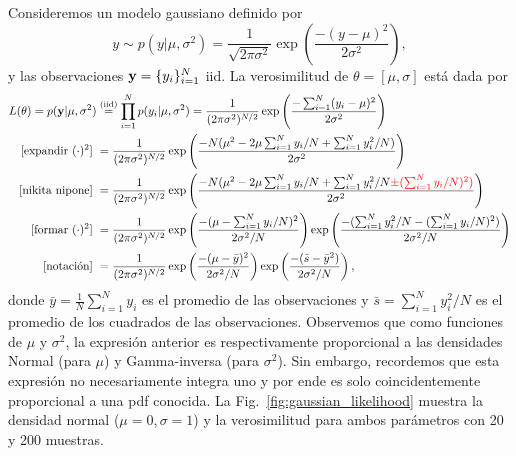 \begin{mdframed}[style=ejemplo, frametitle={\center Ejemplo: Verosimilitud para el modelo gaussiano  (muestras  independientes)}]

Consideremos un  modelo gaussiano definido por 
\begin{equation}
	y \sim p(y|\mu,\sigma^2) = \frac{1}{\sqrt{2\pi\sigma^2}}\exp\left(\frac{-(y-\mu)^2}{2\sigma^2}\right), \label{eq:ejemplo_gaussiano}
\end{equation}
y las observaciones $\mathbf{y} = \{y_i\}_{i=1}^N$ iid. La verosimilitud  de $\theta  =  [\mu,\sigma]$ está dada por 
\begin{align}
  	L(\theta)  =  p(\mathbf{y}|\mu,\sigma^2) 
  				&\stackrel{\text{(iid)}}{=}\prod_{i=1}^N p(y_i|\mu,\sigma^2) 
  				 = \frac{1}{(2\pi\sigma^2)^{N/2}}  \exp\left(\frac{-\sum_{i=1}^N(y_i-\mu)^2}{2\sigma^2}\right)\\
  				\text{[expandir $(\cdot)^2$]}\  & = \frac{1}{(2\pi\sigma^2)^{N/2}}  \exp\left(\frac{-N(\mu^2 - 2\mu\sum_{i=1}^Ny_i/N + \sum_{i=1}^Ny_i^2/N)}{2\sigma^2}\right)\nonumber\\
  				\text{[nikita nipone]}\  & = \frac{1}{(2\pi\sigma^2)^{N/2}}  \exp\left(\frac{-N(\mu^2 - 2\mu\sum_{i=1}^Ny_i/N + \sum_{i=1}^Ny_i^2/N \textcolor{red}{ \pm (\sum_{i=1}^Ny_i/N)^2)}}{2\sigma^2}\right)\nonumber\\
  				\text{[formar $(\cdot)^2$]}\  & = \frac{1}{(2\pi\sigma^2)^{N/2}}  \exp\left(\frac{-(\mu - \sum_{i=1}^Ny_i/N)^2}{2\sigma^2/N}\right)
  				\exp\left(\frac{-(\sum_{i=1}^Ny_i^2/N  - (\sum_{i=1}^Ny_i/N)^2)}{2\sigma^2/N}\right)
  				\nonumber\\
  				\text{[notación]}\  & = \frac{1}{(2\pi\sigma^2)^{N/2}}  \exp\left(\frac{-(\mu - \bar y)^2}{2\sigma^2/N}\right)
  				\exp\left(\frac{-(\bar s  - \bar y^2)}{2\sigma^2/N}\right)
  				\nonumber,
  \end{align}  
  donde $\bar y = \tfrac{1}{N}\sum_{i=1}^Ny_i$ es el promedio de las observaciones y $\bar s = \sum_ {i=1}^Ny_i^2/N$ es el promedio de los cuadrados de las observaciones. Observemos que como funciones de $\mu$ y $\sigma^2$, la expresión anterior es respectivamente  proporcional a las densidades Normal (para $\mu$) y Gamma-inversa (para $\sigma^2$). Sin embargo, recordemos que esta  expresión no necesariamente integra uno y por  ende es solo coincidentemente proporcional a una pdf conocida. La Fig.~\ref{fig:gaussian_likelihood} muestra la  densidad normal ($\mu=0,\sigma=1$) y la verosimilitud para ambos parámetros con 20 y 200 muestras. 


\end{mdframed}

